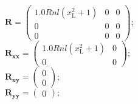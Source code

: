 \documentclass[11pt, oneside]{article}      %
\begin{document}
%
$ \mathbf{R} = \left(\begin{array}{ccc}1.0 Rnl \left(x_{\mathrm{L}}^{2} + 1\right) & 0 & 0\\0 & 0 & 0\\0 & 0 & 0\end{array}\right) ; $ 
%
\\
%
$ \mathbf{R_{xx}} = \left(\begin{array}{cc}1.0 Rnl \left(x_{\mathrm{L}}^{2} + 1\right) & 0\\0 & 0\end{array}\right) ; $ 
%
\\
%
$ \mathbf{R_{xy}} = \left(\begin{array}{c}0\\0\end{array}\right) ; $ 
%
\\
%
$ \mathbf{R_{yy}} = \left(\begin{array}{c}0\end{array}\right) ; $ 
%
\\
%
\end{document}
